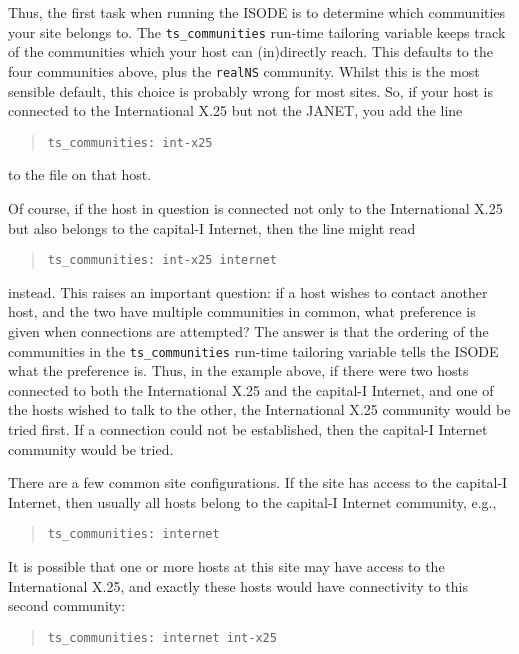Thus,
the first task when running the ISODE is to determine which communities
your site belongs to.
The \verb"ts_communities" run-time tailoring variable keeps track of the
communities which your host can (in)directly reach.
This defaults to the four communities above,
plus the \verb"realNS" community.
Whilst this is the most sensible default,
this choice is probably wrong for most sites.
So,
if your host is connected to the International X.25 but not the JANET,
you add the line
\begin{quote}\small\begin{verbatim}
ts_communities: int-x25
\end{verbatim}\end{quote}
to the  file on that host.

Of course,
if the host in question is connected not only to the International X.25 but
also belongs to the capital-I Internet, then the line might read
\begin{quote}\small\begin{verbatim}
ts_communities: int-x25 internet
\end{verbatim}\end{quote}
instead.
This raises an important question:
if a host wishes to contact another host,
and the two have multiple communities in common,
what preference is given when connections are attempted?
The answer is that the ordering of the communities in the
\verb"ts_communities" run-time tailoring variable tells the ISODE what the
preference is.
Thus,
in the example above,
if there were two hosts connected to both the International X.25 and the
capital-I Internet,
and one of the hosts wished to talk to the other,
the International X.25 community would be tried first.
If a connection could not be established,
then the capital-I Internet community would be tried.

There are a few common site configurations.
If the site has access to the capital-I Internet,
then usually all hosts belong to the capital-I Internet community,
e.g.,
\begin{quote}\small\begin{verbatim}
ts_communities: internet
\end{verbatim}\end{quote}
It is possible that one or more hosts at this site may have access to the
International X.25,
and exactly these hosts would have connectivity to this second community:
\begin{quote}\small\begin{verbatim}
ts_communities: internet int-x25
\end{verbatim}\end{quote}

